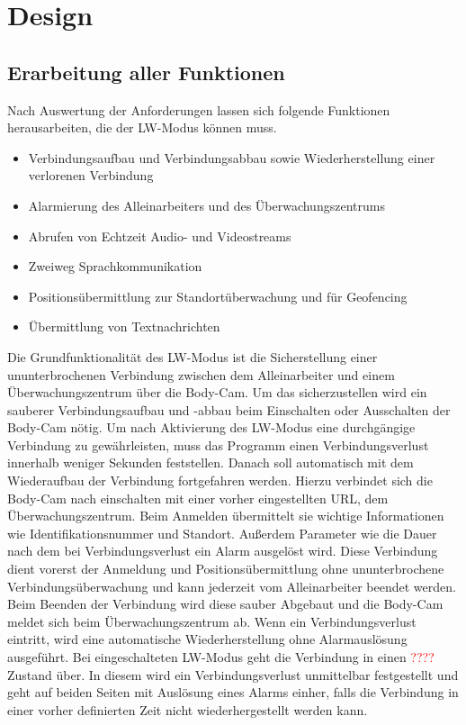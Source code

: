 \documentclass[thesis.tex]{subfiles}
\begin{document}
\chapter{Design}\label{chap:design}

\section{Erarbeitung aller Funktionen}
Nach Auswertung der Anforderungen lassen sich folgende Funktionen herausarbeiten, die der LW-Modus können muss.

\begin{itemize}
    \item Verbindungsaufbau und Verbindungsabbau sowie Wiederherstellung einer verlorenen Verbindung
    \item Alarmierung des Alleinarbeiters und des Überwachungszentrums
    \item Abrufen von Echtzeit Audio- und Videostreams
    \item Zweiweg Sprachkommunikation
    \item Positionsübermittlung zur Standortüberwachung und für Geofencing
    \item Übermittlung von Textnachrichten
\end{itemize}

Die Grundfunktionalität des LW-Modus ist die Sicherstellung einer ununterbrochenen Verbindung zwischen dem Alleinarbeiter und einem Überwachungszentrum über die Body-Cam.
Um das sicherzustellen wird ein sauberer Verbindungsaufbau und -abbau beim Einschalten oder Ausschalten der Body-Cam nötig.
Um nach Aktivierung des LW-Modus eine durchgängige Verbindung zu gewährleisten, muss das Programm einen Verbindungsverlust innerhalb weniger Sekunden feststellen.
Danach soll automatisch mit dem Wiederaufbau der Verbindung fortgefahren werden.
Hierzu verbindet sich die Body-Cam nach einschalten mit einer vorher eingestellten URL, dem Überwachungszentrum.
Beim Anmelden übermittelt sie wichtige Informationen wie Identifikationsnummer und Standort.
Außerdem Parameter wie die Dauer nach dem bei Verbindungsverlust ein Alarm ausgelöst wird.
Diese Verbindung dient vorerst der Anmeldung und Positionsübermittlung ohne ununterbrochene Verbindungsüberwachung und kann jederzeit vom Alleinarbeiter beendet werden.
Beim Beenden der Verbindung wird diese sauber Abgebaut und die Body-Cam meldet sich beim Überwachungszentrum ab.
Wenn ein Verbindungsverlust eintritt, wird eine automatische Wiederherstellung ohne Alarmauslösung ausgeführt.
Bei eingeschalteten LW-Modus geht die Verbindung in einen \textcolor{red}{????} Zustand über.
In diesem wird ein Verbindungsverlust unmittelbar festgestellt und geht auf beiden Seiten mit Auslösung eines Alarms einher, falls die Verbindung in einer vorher definierten Zeit nicht wiederhergestellt werden kann.
\\
\end{document}

